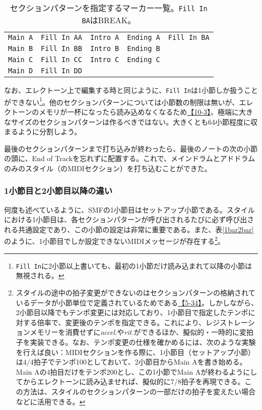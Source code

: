 \documentclass[uplatex, 10pt, dvipdfmx]{jsarticle}
\numberwithin{equation}{section}
\begin{document}
\begin{table}[h]
\caption{セクションパターンを指定するマーカー一覧\cite{style}。\texttt{Fill In BA}はBREAK。}
\label{marker}
\centering
\begin{tabular}{|c|c|c|c|c|}
\hline
\texttt{Main A} & \texttt{Fill In AA} & \texttt{Intro A} & \texttt{Ending A} & \texttt{Fill In BA} \\
\texttt{Main B} & \texttt{Fill In BB} & \texttt{Intro B} & \texttt{Ending B} & \\
\texttt{Main C} & \texttt{Fill In CC} & \texttt{Intro C} & \texttt{Ending C} & \\
\texttt{Main D} & \texttt{Fill In DD} & & & \\
\hline
\end{tabular}
\end{table}

なお、エレクトーン上で編集する時と同じように、\texttt{Fill In}は1小節しか扱うことができない\footnote{\texttt{Fill In}に2小節以上書いても、最初の1小節だけ読み込まれて以降の小節は無視される。}。他のセクションパターンについては小節数の制限は無いが、エレクトーンのメモリが一杯になったら読み込めなくなるため\href{http://els01stylefile.music.coocan.jp/Stagea_Style/Stagea_Style_P1003.htm}{【10-3】}、極端に大きなサイズのセクションパターンは作るべきではない。大きくとも64小節程度に収まるように分割しよう。

最後のセクションパターンまで打ち込みが終わったら、最後のノートの次の小節の頭に、End of Trackを忘れずに配置する。これで、メインドラムとアドドラムのみのスタイル（のMIDIセクション）を打ち込むことができた。

\subsubsection{1小節目と2小節目以降の違い}

何度も述べているように、SMFの1小節目はセットアップ小節である。スタイルにおける1小節目は、各セクションパターンが呼び出されるたびに必ず呼び出される共通設定であり、この小節の設定は非常に重要である。また、表\ref{1bar2bar}のように、1小節目でしか設定できないMIDIメッセージが存在する\cite{style}\footnote{スタイルの途中の拍子変更ができないのはセクションパターンの格納されているデータが小節単位で定義されているためである\href{http://els01stylefile.music.coocan.jp/Stagea_Style/Stagea_Style_P34.htm}{【5-34】}。しかしながら、2小節目以降でもテンポ変更には対応しており、1小節目で指定したテンポに対する倍率で、変更後のテンポを指定できる。これにより、レジストレーションメモリーを消費せずに\textit{accel.}や\textit{rit.}ができるほか、擬似的・一時的に変拍子を実装できる。なお、テンポ変更の仕様を確かめるには、次のような実験を行えば良い：MIDIセクションを作る際に、1小節目（セットアップ小節）は4/4拍子でテンポ100としておいて、2小節目からMain Aを書き始める。Main Aの4拍目だけをテンポ200とし、この1小節でMain Aが終わるようにしてからエレクトーンに読み込ませれば、擬似的に7/8拍子を再現できる。この方法は、スタイルのセクションパターンの一部だけの拍子を変えたい場合などに活用できる。}。
\end{document}
